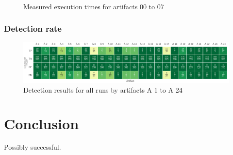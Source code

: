 \begin{figure}
{		}\qquad
	\caption{Measured execution times for artifacts 00 to 07}\label{fig:result-quantity}
\end{figure}

\subsection{Detection rate}

\begin{figure}
	\centering
	\includegraphics[scale=0.32]{fig/quality-confusion-matrix.png}
	\caption{Detection results for all runs by artifacts A 1 to A 24}\label{fig:result-quality-sum}
\end{figure}

\chapter{Conclusion}\label{ch:conclusion}

Possibly successful.
